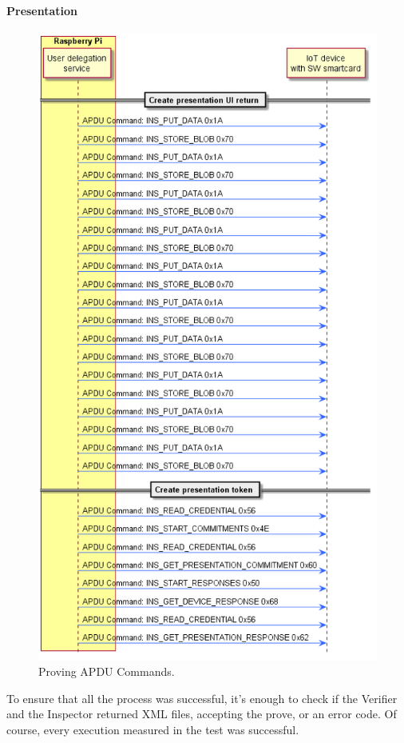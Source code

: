 \paragraph{Presentation}


\begin{figure}[bth]
	\begin{center}
		\includegraphics[width=0.7\linewidth]{gfx/APDUsProving}
	\end{center}
	\caption{Proving APDU Commands.}
	\label{fig:APDUsProving}
\end{figure}

To ensure that all the process was successful, it's enough to check if the Verifier and the Inspector returned XML files, accepting the prove, or an error code. Of course, every execution measured in the test was successful.